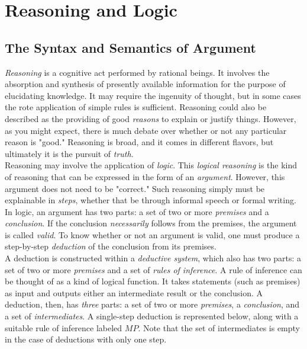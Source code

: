 
\toclineskip
\section{Reasoning and Logic}



\subsection{The Syntax and Semantics of Argument}

\textit{Reasoning} is a cognitive act performed by rational beings. It involves the absorption and synthesis of presently available information for the purpose of elucidating knowledge. It may require the ingenuity of thought, but in some cases the rote application of simple rules is sufficient. Reasoning could also be described as the providing of good \textit{reasons} to explain or justify things. However, as you might expect, there is much debate over whether or not any particular reason is "good." Reasoning is broad, and it comes in different flavors, but ultimately it is the pursuit of \textit{truth}. \\

Reasoning may involve the application of \textit{logic}. This \textit{logical reasoning} is the kind of reasoning that can be expressed in the form of an \textit{argument}. However, this argument does not need to be "correct." Such reasoning simply must be explainable in \textit{steps}, whether that be through informal speech or formal writing. \\

In logic, an argument has two parts: a set of two or more \textit{premises} and a \textit{conclusion}. If the conclusion \textit{necessarily} follows from the premises, the argument is called \textit{valid}. To know whether or not an argument is valid, one must produce a step-by-step \textit{deduction} of the conclusion from its premises. \\

A deduction is constructed within a \textit{deductive system}, which also has two parts: a set of two or more \textit{premises} and a set of \textit{rules of inference}. A rule of inference can be thought of as a kind of logical function. It takes statements (such as premises) as input and outputs either an intermediate result or the conclusion. A deduction, then, has \textit{three} parts: a set of two or more \textit{premises}, a \textit{conclusion}, and a set of \textit{intermediates}. A single-step deduction is represented below, along with a suitable rule of inference labeled $MP$. Note that the set of intermediates is empty in the case of deductions with only one step. \\[2mm]

